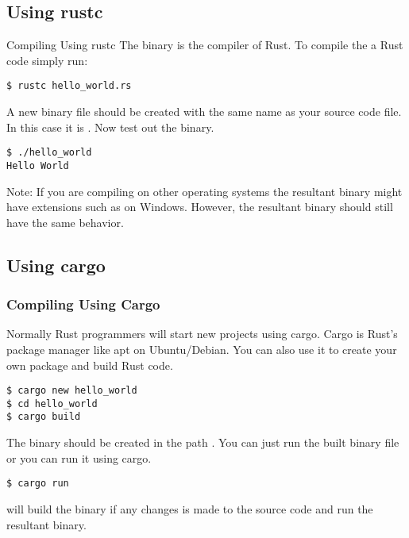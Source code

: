 \documentclass{beamer}
\begin{document}
\subsection{Using rustc}
\begin{frame}[fragile]{Compiling Using rustc}
  The  binary is the compiler of Rust. To compile the a Rust code simply run:

\begin{lstlisting}
$ rustc hello_world.rs
\end{lstlisting}

  A new binary file should be created with the same name as your source code file. In this case it is . Now test out the binary.

\begin{lstlisting}
$ ./hello_world
Hello World
\end{lstlisting}

  \alert{Note:} If you are compiling on other operating systems the resultant binary might have extensions such as  on Windows. However, the resultant binary should still have the same behavior.
\end{frame}

\subsection{Using cargo}
\begin{frame}[fragile]
  \frametitle{Compiling Using Cargo}
  Normally Rust programmers will start new projects using cargo. Cargo is Rust's package manager like apt on Ubuntu/Debian. You can also use it to create your own package and build Rust code.
\begin{lstlisting}
$ cargo new hello_world
$ cd hello_world
$ cargo build
\end{lstlisting}

  The binary should be created in the path . You can just run the built binary file or you can run it using cargo.

\begin{lstlisting}
$ cargo run
\end{lstlisting}

   will build the binary if any changes is made to the source code and run the resultant binary.
\end{frame}
\end{document}
